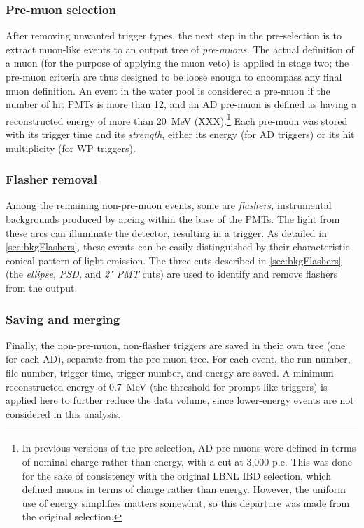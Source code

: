 \documentclass[../thesis.tex]{subfiles}
\begin{document}
\subsubsection{Pre-muon selection}
\label{sec:selPreMuons}

After removing unwanted trigger types, the next step in the pre-selection is to
extract muon-like events to an output tree of \emph{pre-muons.} The actual
definition of a muon (for the purpose of applying the muon veto) is applied in
stage two; the pre-muon criteria are thus designed to be loose enough to
encompass any final muon definition. An event in the water pool is considered a
pre-muon if the number of hit PMTs is more than 12, and an AD pre-muon is
defined as having a reconstructed energy of more than 20~MeV (XXX).\footnote{In
  previous versions of the pre-selection, AD pre-muons were defined in terms of
  nominal charge rather than energy, with a cut at 3,000 p.e. This was done for
  the sake of consistency with the original LBNL IBD selection, which defined
  muons in terms of charge rather than energy. However, the uniform use of
  energy simplifies matters somewhat, so this departure was made from the
  original selection.} Each pre-muon was stored with its trigger time and its
\emph{strength}, either its energy (for AD triggers) or its hit multiplicity
(for WP triggers).

\subsubsection{Flasher removal}
\label{sec:selFlashers}

Among the remaining non-pre-muon events, some are \emph{flashers,} instrumental
backgrounds produced by arcing within the base of the PMTs. The light from these
arcs can illuminate the detector, resulting in a trigger. As detailed in
\autoref{sec:bkgFlashers}, these events can be easily distinguished by their
characteristic conical pattern of light emission. The three cuts described in
\autoref{sec:bkgFlashers} (the \emph{ellipse,} \emph{PSD,} and \emph{2" PMT}
cuts) are used to identify and remove flashers from the output.

\subsubsection{Saving and merging}
\label{sec:selMergingOne}

Finally, the non-pre-muon, non-flasher triggers are saved in their own tree (one
for each AD), separate from the pre-muon tree. For each event, the run number,
file number, trigger time, trigger number, and energy are saved. A minimum
reconstructed energy of 0.7~MeV (the threshold for prompt-like triggers) is
applied here to further reduce the data volume, since lower-energy events are
not considered in this analysis.
\end{document}
